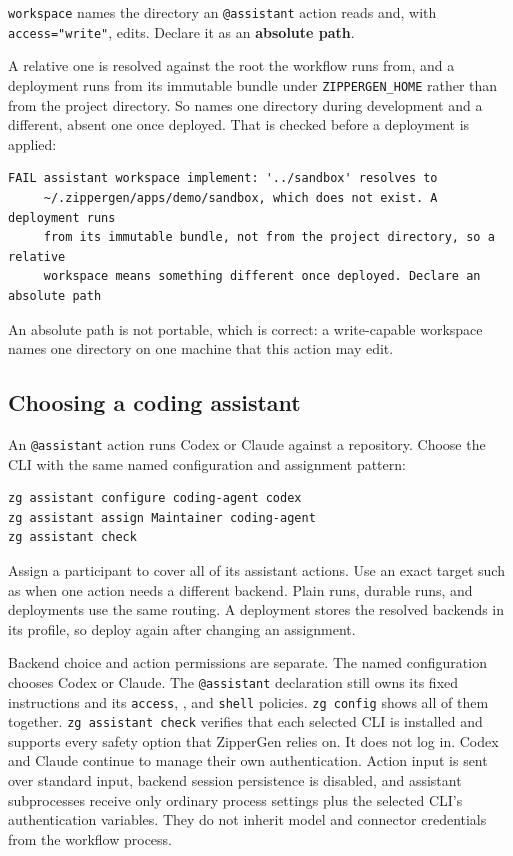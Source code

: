 \documentclass[11pt,a4paper]{article}
\begin{document}
\texttt{workspace} names the directory an \texttt{@assistant} action reads and,
with \texttt{access="write"}, edits. Declare it as an \textbf{absolute path}.

A relative one is resolved against the root the workflow runs from, and a
deployment runs from its immutable bundle under \texttt{ZIPPERGEN\_HOME}
rather than from the project directory. So  names one
directory during development and a different, absent one once deployed. That
is checked before a deployment is applied:

\begin{lstlisting}[style=shell]
FAIL assistant workspace implement: '../sandbox' resolves to
     ~/.zippergen/apps/demo/sandbox, which does not exist. A deployment runs
     from its immutable bundle, not from the project directory, so a relative
     workspace means something different once deployed. Declare an absolute path
\end{lstlisting}

An absolute path is not portable, which is correct: a write-capable workspace
names one directory on one machine that this action may edit.

\subsection{Choosing a coding assistant}

An \texttt{@assistant} action runs Codex or Claude against a repository. Choose
the CLI with the same named configuration and assignment pattern:

\begin{lstlisting}[style=shell]
zg assistant configure coding-agent codex
zg assistant assign Maintainer coding-agent
zg assistant check
\end{lstlisting}

Assign a participant to cover all of its assistant actions. Use an exact target
such as  when one action needs a
different backend. Plain runs, durable runs, and deployments use the same
routing. A deployment stores the resolved backends in its profile, so deploy
again after changing an assignment.

Backend choice and action permissions are separate. The named configuration
chooses Codex or Claude. The \texttt{@assistant} declaration still owns its
fixed instructions and its \texttt{access}, , and
\texttt{shell} policies. \texttt{zg config} shows all of them together.
\texttt{zg assistant check} verifies that each selected CLI is installed and
supports every safety option that ZipperGen relies on. It does not log in.
Codex and Claude continue to manage their own authentication.
Action input is sent over standard input, backend session persistence is
disabled, and assistant subprocesses receive only ordinary process settings
plus the selected CLI's authentication variables. They do not inherit model
and connector credentials from the workflow process.
\end{document}
